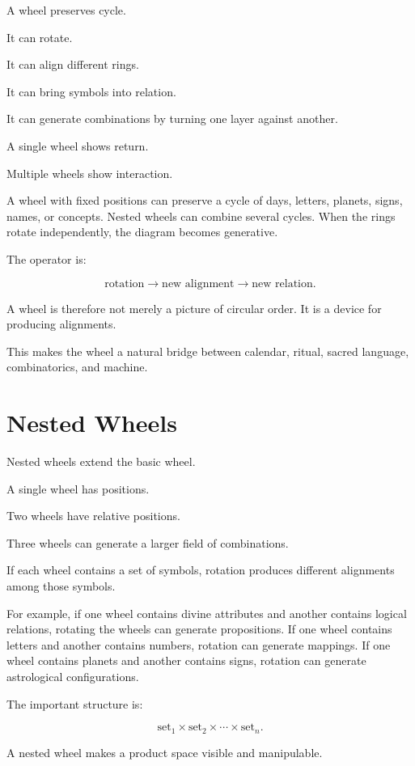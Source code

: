 \documentclass[11pt]{book}
\begin{document}
A wheel preserves cycle.

It can rotate.

It can align different rings.

It can bring symbols into relation.

It can generate combinations by turning one layer against another.

A single wheel shows return.

Multiple wheels show interaction.

A wheel with fixed positions can preserve a cycle of days, letters, planets, signs, names, or concepts. Nested wheels can combine several cycles. When the rings rotate independently, the diagram becomes generative.

The operator is:

\[
\text{rotation}
\rightarrow
\text{new alignment}
\rightarrow
\text{new relation}.
\]

A wheel is therefore not merely a picture of circular order. It is a device for producing alignments.

This makes the wheel a natural bridge between calendar, ritual, sacred language, combinatorics, and machine.

\section{Nested Wheels}

Nested wheels extend the basic wheel.

A single wheel has positions.

Two wheels have relative positions.

Three wheels can generate a larger field of combinations.

If each wheel contains a set of symbols, rotation produces different alignments among those symbols.

For example, if one wheel contains divine attributes and another contains logical relations, rotating the wheels can generate propositions. If one wheel contains letters and another contains numbers, rotation can generate mappings. If one wheel contains planets and another contains signs, rotation can generate astrological configurations.

The important structure is:

\[
\text{set}_1 \times \text{set}_2 \times \cdots \times \text{set}_n.
\]

A nested wheel makes a product space visible and manipulable.
\end{document}
